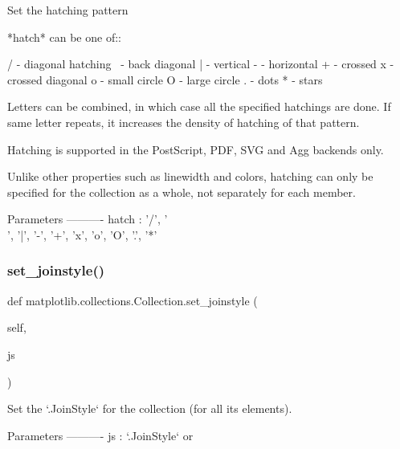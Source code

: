 \begin{DoxyVerb}Set the hatching pattern

*hatch* can be one of::

  /   - diagonal hatching
  \   - back diagonal
  |   - vertical
  -   - horizontal
  +   - crossed
  x   - crossed diagonal
  o   - small circle
  O   - large circle
  .   - dots
  *   - stars

Letters can be combined, in which case all the specified
hatchings are done.  If same letter repeats, it increases the
density of hatching of that pattern.

Hatching is supported in the PostScript, PDF, SVG and Agg
backends only.

Unlike other properties such as linewidth and colors, hatching
can only be specified for the collection as a whole, not separately
for each member.

Parameters
----------
hatch : {'/', '\\', '|', '-', '+', 'x', 'o', 'O', '.', '*'}
\end{DoxyVerb}
 \mbox{\label{classmatplotlib_1_1collections_1_1Collection_a9593b9910e5abcf7be47ed7909039518}} 
\subsubsection{\texorpdfstring{set\+\_\+joinstyle()}{set\_joinstyle()}}
{\footnotesize\ttfamily def matplotlib.\+collections.\+Collection.\+set\+\_\+joinstyle (\begin{DoxyParamCaption}\item[{}]{self,  }\item[{}]{js }\end{DoxyParamCaption})}

\begin{DoxyVerb}Set the `.JoinStyle` for the collection (for all its elements).

Parameters
----------
js : `.JoinStyle` or %
\end{DoxyVerb}
 \mbox{\label{classmatplotlib_1_1collections_1_1Collection_a852cedf2da8db5b1e0048f78de61b90c}} 

